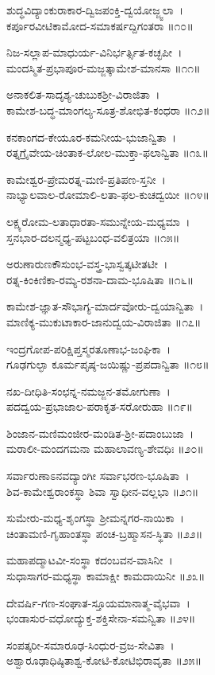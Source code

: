 ಶುದ್ಧವಿದ್ಯಾಂಕುರಾಕಾರ-ದ್ವಿಜಪಂಕ್ತಿ-ದ್ವಯೋಜ್ಜ್ವಲಾ~।\\
ಕರ್ಪೂರವೀಟಿಕಾಮೋದ-ಸಮಾಕರ್ಷದ್ದಿಗಂತರಾ ॥೧೦॥

ನಿಜ-ಸಲ್ಲಾಪ-ಮಾಧುರ್ಯ-ವಿನಿರ್ಭರ್ತ್ಸಿತ-ಕಚ್ಛಪೀ~।\\
ಮಂದಸ್ಮಿತ-ಪ್ರಭಾಪೂರ-ಮಜ್ಜತ್ಕಾಮೇಶ-ಮಾನಸಾ ॥೧೧॥

ಅನಾಕಲಿತ-ಸಾದೃಶ್ಯ-ಚುಬುಕಶ್ರೀ-ವಿರಾಜಿತಾ~।\\
ಕಾಮೇಶ-ಬದ್ಧ-ಮಾಂಗಲ್ಯ-ಸೂತ್ರ-ಶೋಭಿತ-ಕಂಧರಾ ॥೧೨॥

ಕನಕಾಂಗದ-ಕೇಯೂರ-ಕಮನೀಯ-ಭುಜಾನ್ವಿತಾ~।\\
ರತ್ನಗ್ರೈವೇಯ-ಚಿಂತಾಕ-ಲೋಲ-ಮುಕ್ತಾ-ಫಲಾನ್ವಿತಾ ॥೧೩॥

ಕಾಮೇಶ್ವರ-ಪ್ರೇಮರತ್ನ-ಮಣಿ-ಪ್ರತಿಪಣ-ಸ್ತನೀ~।\\
ನಾಭ್ಯಾಲವಾಲ-ರೋಮಾಲಿ-ಲತಾ-ಫಲ-ಕುಚದ್ವಯೀ ॥೧೪॥

ಲಕ್ಷ್ಯರೋಮ-ಲತಾಧಾರತಾ-ಸಮುನ್ನೇಯ-ಮಧ್ಯಮಾ~।\\
ಸ್ತನಭಾರ-ದಲನ್ಮಧ್ಯ-ಪಟ್ಟಬಂಧ-ವಲಿತ್ರಯಾ ॥೧೫॥

ಅರುಣಾರುಣಕೌಸುಂಭ-ವಸ್ತ್ರ-ಭಾಸ್ವತ್ಕಟೀತಟೀ~।\\
ರತ್ನ-ಕಿಂಕಿಣಿಕಾ-ರಮ್ಯ-ರಶನಾ-ದಾಮ-ಭೂಷಿತಾ ॥೧೬॥

ಕಾಮೇಶ-ಜ್ಞಾತ-ಸೌಭಾಗ್ಯ-ಮಾರ್ದವೋರು-ದ್ವಯಾನ್ವಿತಾ~।\\
ಮಾಣಿಕ್ಯ-ಮುಕುಟಾಕಾರ-ಜಾನುದ್ವಯ-ವಿರಾಜಿತಾ ॥೧೭॥

ಇಂದ್ರಗೋಪ-ಪರಿಕ್ಷಿಪ್ತಸ್ಮರತೂಣಾಭ-ಜಂಘಿಕಾ~।\\
ಗೂಢಗುಲ್ಫಾ ಕೂರ್ಮಪೃಷ್ಠ-ಜಯಿಷ್ಣು-ಪ್ರಪದಾನ್ವಿತಾ ॥೧೮॥

ನಖ-ದೀಧಿತಿ-ಸಂಛನ್ನ-ನಮಜ್ಜನ-ತಮೋಗುಣಾ~।\\
ಪದದ್ವಯ-ಪ್ರಭಾಜಾಲ-ಪರಾಕೃತ-ಸರೋರುಹಾ ॥೧೯॥

ಶಿಂಜಾನ-ಮಣಿಮಂಜೀರ-ಮಂಡಿತ-ಶ್ರೀ-ಪದಾಂಬುಜಾ~।\\
ಮರಾಲೀ-ಮಂದಗಮನಾ ಮಹಾಲಾವಣ್ಯ-ಶೇವಧಿಃ ॥೨೦॥

ಸರ್ವಾರುಣಾಽನವದ್ಯಾಂಗೀ ಸರ್ವಾಭರಣ-ಭೂಷಿತಾ~।\\
ಶಿವ-ಕಾಮೇಶ್ವರಾಂಕಸ್ಥಾ ಶಿವಾ ಸ್ವಾಧೀನ-ವಲ್ಲಭಾ ॥೨೧॥

ಸುಮೇರು-ಮಧ್ಯ-ಶೃಂಗಸ್ಥಾ ಶ್ರೀಮನ್ನಗರ-ನಾಯಿಕಾ~।\\
ಚಿಂತಾಮಣಿ-ಗೃಹಾಂತಸ್ಥಾ ಪಂಚ-ಬ್ರಹ್ಮಾಸನ-ಸ್ಥಿತಾ ॥೨೨॥

ಮಹಾಪದ್ಮಾಟವೀ-ಸಂಸ್ಥಾ ಕದಂಬವನ-ವಾಸಿನೀ~।\\
ಸುಧಾಸಾಗರ-ಮಧ್ಯಸ್ಥಾ ಕಾಮಾಕ್ಷೀ ಕಾಮದಾಯಿನೀ ॥೨೩॥

ದೇವರ್ಷಿ-ಗಣ-ಸಂಘಾತ-ಸ್ತೂಯಮಾನಾತ್ಮ-ವೈಭವಾ~।\\
ಭಂಡಾಸುರ-ವಧೋದ್ಯುಕ್ತ-ಶಕ್ತಿಸೇನಾ-ಸಮನ್ವಿತಾ ॥೨೪॥

ಸಂಪತ್ಕರೀ-ಸಮಾರೂಢ-ಸಿಂಧುರ-ವ್ರಜ-ಸೇವಿತಾ~।\\
ಅಶ್ವಾರೂಢಾಧಿಷ್ಠಿತಾಶ್ವ-ಕೋಟಿ-ಕೋಟಿಭಿರಾವೃತಾ ॥೨೫॥

